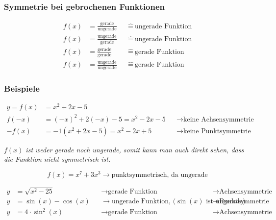 \subsubsection{Symmetrie bei gebrochenen Funktionen}

\begin{align*}
    f(x) &= \frac{\text{gerade}}{\text{ungerade}} &&\hat{=}\ \text{ungerade Funktion} \\
    f(x) &= \frac{\text{ungerade}}{\text{gerade}} &&\hat{=}\ \text{ungerade Funktion} \\
    f(x) &= \frac{\text{gerade}}{\text{gerade}} &&\hat{=}\ \text{gerade Funktion} \\
    f(x) &= \frac{\text{ungerade}}{\text{ungerade}} &&\hat{=}\ \text{gerade Funktion}
\end{align*}

\subsubsection{Beispiele}

\begin{align*}
    y = f(x) &= x^2 + 2x - 5 \\
    f(-x) &= {(-x)}^2 + 2(-x) - 5 = x^2 - 2x - 5 &&\rightarrow \text{keine Achsensymmetrie} \\
    -f(x) &= -1(x^2 + 2x - 5) = x^2 - 2x +5 &&\rightarrow \text{keine Punktsymmetrie}
\end{align*}

\textit{\(f(x)\) ist weder gerade noch ungerade, somit kann man auch direkt sehen,
    dass die Funktion nicht symmetrisch ist.}


\[
    f(x) = x^7 + 3x^3 \rightarrow \text{punktsymmetrisch, da ungerade}
\]

\begin{align*}
    y &= \sqrt{x^2 - 25} &&\rightarrow \text{gerade Funktion} &&\rightarrow \text{Achsensymmetrie} \\
    y &= \sin(x) - \cos(x) &&\rightarrow \text{ungerade Funktion, (\(\sin(x)\) ist ungerade)} &&\rightarrow \text{Punktsymmetrie} \\
    y &= 4 \cdot \sin^2(x) &&\rightarrow \text{gerade Funktion} &&\rightarrow \text{Achsensymmetrie}
\end{align*}


